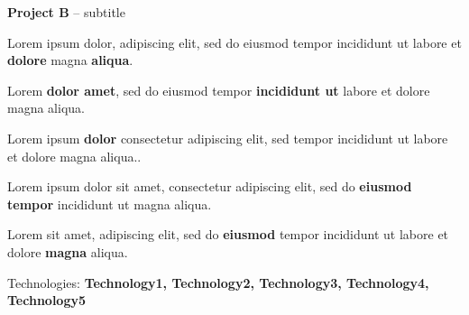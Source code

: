 \documentclass[11pt]{resume} %
\begin{document}
\medskip


{\bf Project B} -- subtitle\\[-25]
\begin{list}{\textbullet}{\leftmargin=0.6em \itemindent=0.45em}
    \item Lorem ipsum dolor, adipiscing elit, sed do eiusmod tempor incididunt ut labore et \textbf{dolore} magna \textbf{aliqua}. 
    
    \item Lorem \textbf{dolor amet}, sed do eiusmod tempor \textbf{incididunt ut} labore et dolore magna aliqua. 
    
    \item Lorem ipsum \textbf{dolor} consectetur adipiscing elit, sed tempor incididunt ut labore et dolore magna aliqua..
    
    \item Lorem ipsum dolor sit amet, consectetur adipiscing elit, sed do \textbf{eiusmod tempor} incididunt ut magna aliqua.
    
    \item Lorem  sit amet, adipiscing elit, sed do \textbf{eiusmod} tempor incididunt ut labore et dolore \textbf{magna} aliqua.
    
    \item Technologies: \textbf{Technology1, Technology2, Technology3, Technology4, Technology5}
\end{list}
\end{document}
